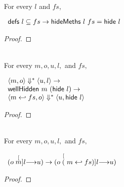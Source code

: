 \begin{lemma}
  \label{lem-hidemeths}
  \mbox{}\\
  For every $l$ and $fs$,
  \begin{center}
    \begin{math}
      \begin{array}{l}
        \defsof{l} \subseteq fs \to \hidemeths{l}{fs} = \hide{l}
      \end{array}
    \end{math}
  \end{center}
\end{lemma}
\begin{proof}
\end{proof}

\begin{lemma}
  \label{lem-inlinedmssub}
  \mbox{}\\
  For every $m, o, u, l,$ and $fs,$
  \begin{center}
    \begin{math}
      \begin{array}{l}
        \semsss{m}{o}{u}{l} \to \\
        \wellhidden{m}{(\hide{l})} \to \\
        \semsss{\inlinedms{m}{fs}}{o}{u}{\hide{l}}
      \end{array}
    \end{math}
  \end{center}
\end{lemma}
\begin{proof}
\end{proof}

\begin{lemma}
  \label{lem-inlinedms}
  \mbox{}\\
  For every $m, o, u, l,$ and $fs,$
  \begin{center}
    \begin{math}
      \begin{array}{l}
        (\semstep{m}{o}{u}{l}) \to (\semstep{(\inlinedms{m}{fs})}{o}{u}{l})
      \end{array}
    \end{math}
  \end{center}
\end{lemma}
\begin{proof}
\end{proof}

